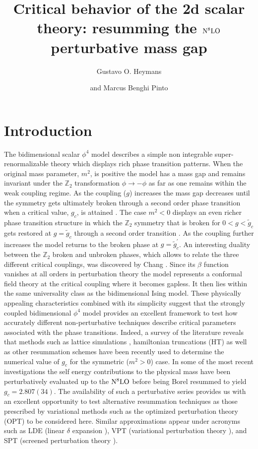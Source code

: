 \documentclass[a4paper,11pt]{article}
\title{\boldmath Critical behavior of the 2d scalar theory: resumming the ${\rm N}^8{\rm LO}$ perturbative mass gap}
\author{Gustavo O. Heymans}
\author{and Marcus Benghi Pinto}
\affiliation{Departamento de F\'{\i}sica, Universidade Federal de Santa
  Catarina, 88040-900 Florian\'{o}polis, SC, Brazil}
\begin{document}
 
\maketitle
\flushbottom
\section{Introduction} 

The bidimensional scalar $\phi^4$ model describes a simple non integrable super-renormalizable theory which displays  rich phase transition patterns. When the original mass parameter, $m^2$, is positive the model has a mass gap and remains  invariant under the   $\mathbb{Z}_2$ transformation $\phi \to -\phi$  as far as one remains within the weak coupling regime. As the coupling ($g$) increases the mass gap decreases until the symmetry gets ultimately broken through a second order phase transition when a critical value, $g_c$, is attained \cite{chang,simon}. The case $m^2 <0$ displays an even richer phase transition structure in which the $\mathbb{Z}_2$ symmetry that is broken for $0 < g < {\tilde g}_c$ gets restored at $g= {\tilde g}_c$ through a second order transition \cite{serone2}. As the coupling further increases the model returns to the broken phase at $g =  {\tilde g}^\prime_c$. An interesting  duality between the   $\mathbb{Z}_2$ broken and unbroken phases, which allows to relate the three different critical couplings,  was discovered by Chang \cite{chang}.   Since its $\beta$ function vanishes at all orders in perturbation theory the model  represents a conformal field theory  at the critical coupling where  it becomes gapless. It then lies within the same universality class as the bidimensional Ising model.  These physically appealing characteristics  combined with its simplicity suggest that the strongly coupled bidimensional $ \phi^4$ model provides an excellent framework to test how accurately different non-perturbative techniques describe critical parameters associated with the phase transitions.  Indeed, a survey of the literature reveals that methods such as lattice simulations \cite{lattice1, lattice2, lattice3, lattice4},  hamiltonian truncations (HT) \cite{hamilton1, hamilton2, hamilton3,hamilton4, hamilton5, hamilton6, hamilton7, hamilton8, hamilton9, hamilton10} as well as other resummation schemes \cite {paul} have  been recently used  to  determine the numerical value of $g_c$ for the symmetric ($m^2 > 0$) case. In some of the most recent investigations \cite {serone1,serone3} the self energy contributions to the physical mass have been perturbatively evaluated up to the ${\rm N}^8{\rm LO}$ before being Borel resummed to yield $g_c = 2.807(34)$. The availability of such a perturbative series provides us with an excellent opportunity to test  alternative resummation techniques as those prescribed by variational methods such as the optimized perturbation theory (OPT) \cite {opt_phi4, opt_qcd} to be considered here. Similar 
approximations appear under  acronyms such as LDE (linear $\delta$ expansion \cite{lde}), VPT
(variational perturbation theory \cite {vpt}), and SPT (screened perturbation theory \cite{spt}).
\end{document}
